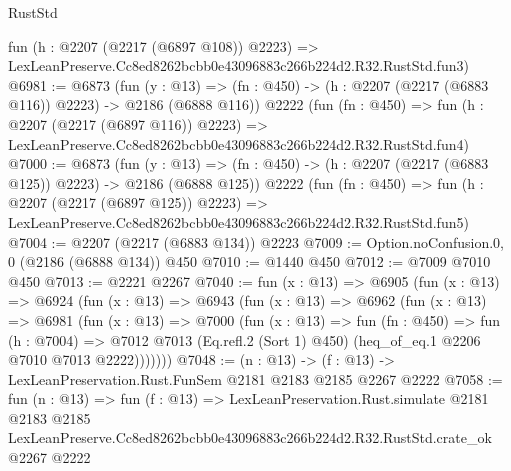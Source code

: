 \begin{lexlean}{RustStd}
\begin{coremodule}
    fun (h : @2207 (@2217 (@6897 @108)) @2223) =>
    LexLeanPreserve.Cc8ed8262bcbb0e43096883c266b224d2.R32.RustStd.fun3)
@6981 := @6873
    (fun (y : @13) => (fn : @450) -> (h : @2207 (@2217 (@6883 @116)) @2223) -> @2186 (@6888 @116))
    @2222
    (fun (fn : @450) =>
    fun (h : @2207 (@2217 (@6897 @116)) @2223) =>
    LexLeanPreserve.Cc8ed8262bcbb0e43096883c266b224d2.R32.RustStd.fun4)
@7000 := @6873
    (fun (y : @13) => (fn : @450) -> (h : @2207 (@2217 (@6883 @125)) @2223) -> @2186 (@6888 @125))
    @2222
    (fun (fn : @450) =>
    fun (h : @2207 (@2217 (@6897 @125)) @2223) =>
    LexLeanPreserve.Cc8ed8262bcbb0e43096883c266b224d2.R32.RustStd.fun5)
@7004 := @2207 (@2217 (@6883 @134)) @2223
@7009 := Option.noConfusion.{0, 0} (@2186 (@6888 @134)) @450
@7010 := @1440 @450
@7012 := @7009 @7010 @450
@7013 := @2221 @2267
@7040 := fun (x : @13) =>
  @6905
    (fun (x : @13) =>
    @6924
      (fun (x : @13) =>
      @6943
        (fun (x : @13) =>
        @6962
          (fun (x : @13) =>
          @6981
            (fun (x : @13) =>
            @7000
              (fun (x : @13) =>
              fun (fn : @450) =>
              fun (h : @7004) =>
              @7012 @7013 (Eq.refl.{2} (Sort 1) @450) (heq_of_eq.{1} @2206 @7010 @7013 @2222)))))))
@7048 := (n : @13) -> (f : @13) -> LexLeanPreservation.Rust.FunSem @2181 @2183 @2185 @2267 @2222
@7058 := fun (n : @13) =>
  fun (f : @13) =>
  LexLeanPreservation.Rust.simulate
    @2181
    @2183
    @2185
    LexLeanPreserve.Cc8ed8262bcbb0e43096883c266b224d2.R32.RustStd.crate_ok
    @2267
    @2222
\end{coremodule}
\end{lexlean}
